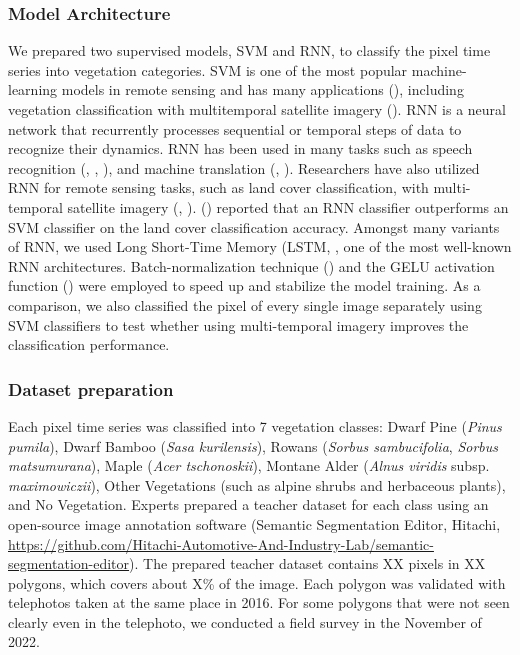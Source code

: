 \documentclass{article}
\begin{document}
\hypertarget{model-architecture}{%
\subsubsection{Model Architecture}\label{model-architecture}}

We prepared two supervised models, SVM and RNN, to classify the pixel time series into vegetation categories. SVM is one of the most popular machine-learning models in remote sensing and has many applications (\cite{Mountrakis2011SVMReview}), including vegetation classification with multitemporal satellite imagery (\cite{Tigges2013RemSenEnv}). RNN is a neural network that recurrently processes sequential or temporal steps of data to recognize their dynamics. RNN has been used in many tasks such as speech recognition (\cite{Graves2013SpeechRNN}, \cite{Graves2014SpeechRNN}, \cite{Sak2014acousticLSTM}), and machine translation (\cite{Auli2013translationRNN}, \cite{Cho2014RNN}). Researchers have also utilized RNN for remote sensing tasks, such as land cover classification, with multi-temporal satellite imagery (\cite{Ienco2017RemSenLSTM}, \cite{Sharma2018NN}). (\cite{Ienco2017RemSenLSTM}) reported that an RNN classifier outperforms an SVM classifier on the land cover classification accuracy. Amongst many variants of RNN, we used Long Short-Time Memory (LSTM, \cite{Hochreiter1997LSTM}, one of the most well-known RNN architectures. Batch-normalization technique (\cite{IoffeSzegedy2015BatchNorm}) and the GELU activation function (\cite{HendrycksGimpel2016GELU}) were employed to speed up and stabilize the model training. As a comparison, we also classified the pixel of every single image separately using SVM classifiers to test whether using multi-temporal imagery improves the classification performance.

\hypertarget{dataset-preparation}{%
\subsubsection{Dataset preparation}\label{dataset-preparation}}

Each pixel time series was classified into 7 vegetation classes: Dwarf Pine (\emph{Pinus pumila}), Dwarf Bamboo (\emph{Sasa kurilensis}), Rowans (\emph{Sorbus sambucifolia}, \emph{Sorbus matsumurana}), Maple (\emph{Acer tschonoskii}), Montane Alder (\emph{Alnus viridis} subsp. \emph{maximowiczii}), Other Vegetations (such as alpine shrubs and herbaceous plants), and No Vegetation. Experts prepared a teacher dataset for each class using an open-source image annotation software (Semantic Segmentation Editor, Hitachi, \url{https://github.com/Hitachi-Automotive-And-Industry-Lab/semantic-segmentation-editor}). The prepared teacher dataset contains XX pixels in XX polygons, which covers about X\% of the image. Each polygon was validated with telephotos taken at the same place in 2016. For some polygons that were not seen clearly even in the telephoto, we conducted a field survey in the November of 2022.
\end{document}
